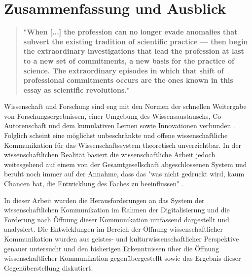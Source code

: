 \chapter{Zusammenfassung und Ausblick}

\begin{quote}
\textbf{"When [...] the profession can no longer evade anomalies that subvert the existing tradition of scientific practice — then begin the extraordinary investigations that lead the profession at last to a new set of commitments, a new basis for the practice of science. The extraordinary episodes in which that shift of professional commitments occurs are the ones known in this essay as scientific revolutions."}
\end{quote} \cite[:6]{Kuhn_2012}

Wissenschaft und Forschung sind eng mit den Normen der schnellen Weitergabe von Forschungsergebnissen, einer Umgebung des Wissensaustauschs, Co-Autorenschaft und dem kumulativen Lernen sowie Innovationen verbunden \cite{Partha_1994}. Folglich scheint eine möglichst unbeschränkte und offene wissenschaftliche Kommunikation für das Wissenschaftssystem theoretisch unverzichtbar. In der wissenschaftlichen Realität basiert die wissenschaftliche Arbeit jedoch weitesgehend auf einem von der Gesamtgesellschaft abgeschlossenen System und beruht noch immer auf der Annahme, dass das "was nicht gedruckt wird, kaum Chancen hat, die Entwicklung des Faches zu beeinflussen" \cite{luhmann_1997_gesellschaft}.

In dieser Arbeit wurden die Herausforderungen an das System der wissenschaftlichen Kommunikation im Rahmen der Digitalisierung und die Forderung nach Öffnung dieser Kommunikation umfassend dargestellt und analysiert. Die Entwicklungen im Bereich der Öffnung wissenschaftlicher Kommunikation wurden aus geistes- und kulturwissenschaftlicher Perspektive genauer untersucht und den bisherigen Erkenntnissen über die Öffnung wissenschaftlicher Kommunikation gegenübergestellt sowie das Ergebnis dieser Gegenüberstellung diskutiert.

